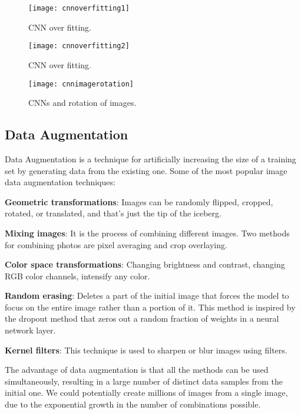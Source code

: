 	\begin{figure}[tbh]
		\centering
		\texttt{[image: cnnoverfitting1]}
		\caption[CNN over fitting]{CNN over fitting.}
		\label{fig:cnnoverfitting1}
	\end{figure}
	\begin{figure}[tbh]
		\centering
		\texttt{[image: cnnoverfitting2]}
		\caption[CNN over fitting]{CNN over fitting.}
		\label{fig:cnnoverfitting2}
	\end{figure}
	\begin{figure}[tbh]
		\centering
		\texttt{[image: cnnimagerotation]}
		\caption[CNNs and rotation of images]{CNNs and rotation of images.}
		\label{fig:cnnimagerotation}
	\end{figure}

	\subsection{Data Augmentation}
	\begin{bulletedlist}
		\item Data Augmentation is a technique for artificially increasing the size of a training set by generating data from the existing one. Some of the most popular image data augmentation techniques:
		\begin{bulletedlist}
			\item \textbf{Geometric transformations}: Images can be randomly flipped, cropped, rotated, or translated, and that's just the tip of the iceberg.
			\item \textbf{Mixing images}: It is the process of combining different images. Two methods for combining photos are pixel averaging and crop overlaying.
			\item \textbf{Color space transformations}: Changing brightness and contrast, changing RGB color channels, intensify any color.
			\item \textbf{Random erasing}: Deletes a part of the initial image that forces the model to focus on the entire image rather than a portion of it.  This method is inspired by the dropout method that zeros out a random fraction of weights in a neural network layer.
			\item \textbf{Kernel filters}: This technique is used to sharpen or blur images using filters.
		\end{bulletedlist}
		\item The advantage of data augmentation is that all the methods can be used simultaneously, resulting in a large number of distinct data samples from the initial one. We could potentially create millions of images from a single image, due to the exponential growth in the number of combinations possible.
	\end{bulletedlist}

